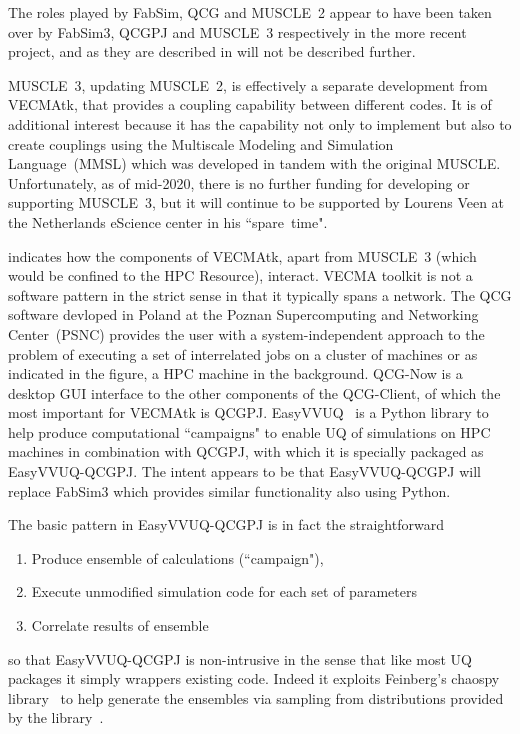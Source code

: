 The roles played by FabSim, QCG and MUSCLE~2 appear to have been taken over by
FabSim3, QCGPJ and MUSCLE~3 respectively in the more recent project, and as
they are described in  will not be described further. 

MUSCLE~3, updating MUSCLE~2, is effectively a separate development from VECMAtk, that provides a coupling
capability between different codes. It is of additional interest because it has
the capability not only to implement but also to create couplings using the 
Multiscale Modeling and Simulation Language~(MMSL) which was developed in tandem
with the original MUSCLE. Unfortunately, as of mid-2020, there is no further 
funding for developing or supporting MUSCLE~3, but it will continue to be 
supported by Lourens Veen at the Netherlands eScience center in his ``spare~time".

 indicates how the components of VECMAtk, apart from MUSCLE~3
(which would be confined to the HPC Resource), interact.
VECMA toolkit is not a software pattern in the strict sense in that
it typically spans a network. The QCG software devloped in Poland at
the Poznan Supercomputing and Networking Center~(PSNC) provides the
user with a system-independent
approach to the problem of executing a set of interrelated jobs on
a cluster of machines or as indicated in the figure, a HPC machine in the
background. QCG-Now is a desktop GUI interface to the other components
of the QCG-Client, of which the most important for VECMAtk is QCGPJ.
EasyVVUQ~\cite{Ri20Easy} is a Python library to help produce computational ``campaigns"
to enable UQ of simulations on HPC machines in combination with QCGPJ,
with which it is specially packaged as EasyVVUQ-QCGPJ. The intent appears to be that
EasyVVUQ-QCGPJ will replace FabSim3 which provides similar functionality also using Python.

The basic pattern in EasyVVUQ-QCGPJ is in fact the straightforward~\cite{Wr20Buil}
\begin{enumerate}
\item Produce ensemble of calculations (``campaign"),
\item Execute unmodified simulation code for each set of parameters
\item Correlate results of ensemble
\end{enumerate}
so that EasyVVUQ-QCGPJ is non-intrusive in the sense that like most UQ packages
it simply wrappers existing code.  Indeed it exploits Feinberg's chaospy library~\cite{Fe15chao}
to help generate the ensembles via sampling from distributions provided by the 
library~\cite{chaospywebsite}.


